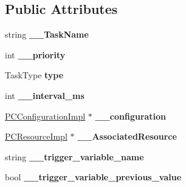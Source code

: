 \subsection*{Public Attributes}
\begin{DoxyCompactItemize}
\item 
string {\bfseries \+\_\+\+\_\+\+Task\+Name}\hypertarget{classpc__emulator_1_1Task_ae659eede17f37cc8336a3884b206c765}{}\label{classpc__emulator_1_1Task_ae659eede17f37cc8336a3884b206c765}

\item 
int {\bfseries \+\_\+\+\_\+priority}\hypertarget{classpc__emulator_1_1Task_aad766fc8627db19432089f1bcd9ff0fc}{}\label{classpc__emulator_1_1Task_aad766fc8627db19432089f1bcd9ff0fc}

\item 
Task\+Type {\bfseries type}\hypertarget{classpc__emulator_1_1Task_ad86892b4819c15f08fccf22b139236d3}{}\label{classpc__emulator_1_1Task_ad86892b4819c15f08fccf22b139236d3}

\item 
int {\bfseries \+\_\+\+\_\+interval\+\_\+ms}\hypertarget{classpc__emulator_1_1Task_a261375b14a8fd7c1befdbf733750d253}{}\label{classpc__emulator_1_1Task_a261375b14a8fd7c1befdbf733750d253}

\item 
\hyperlink{classpc__emulator_1_1PCConfigurationImpl}{P\+C\+Configuration\+Impl} $\ast$ {\bfseries \+\_\+\+\_\+configuration}\hypertarget{classpc__emulator_1_1Task_adc25e243386c88f3939b1ec38fb84e12}{}\label{classpc__emulator_1_1Task_adc25e243386c88f3939b1ec38fb84e12}

\item 
\hyperlink{classpc__emulator_1_1PCResourceImpl}{P\+C\+Resource\+Impl} $\ast$ {\bfseries \+\_\+\+\_\+\+Associated\+Resource}\hypertarget{classpc__emulator_1_1Task_a7ece4d62e9640ec475988b6c2ad0e7e0}{}\label{classpc__emulator_1_1Task_a7ece4d62e9640ec475988b6c2ad0e7e0}

\item 
string {\bfseries \+\_\+\+\_\+trigger\+\_\+variable\+\_\+name}\hypertarget{classpc__emulator_1_1Task_a867ac3aa2ce1a9831309dc480ac6c23b}{}\label{classpc__emulator_1_1Task_a867ac3aa2ce1a9831309dc480ac6c23b}

\item 
bool {\bfseries \+\_\+\+\_\+trigger\+\_\+variable\+\_\+previous\+\_\+value}\hypertarget{classpc__emulator_1_1Task_a8ad0a6048c55a4496435b0b9517608ad}{}\label{classpc__emulator_1_1Task_a8ad0a6048c55a4496435b0b9517608ad}


\end{DoxyCompactItemize}
